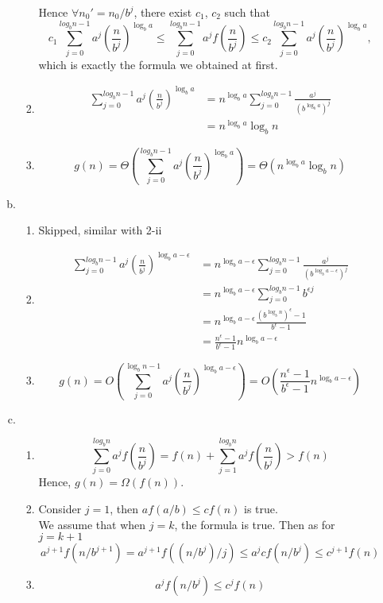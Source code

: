 \documentclass[a4paper]{article}
\begin{document}
\begin{enumerate}[1.]
\begin{enumerate}[a)]
\begin{enumerate}[i - ]
				Hence $\forall n_0' = n_0/b^j$, there exist $c_1$, $c_2$ such that
				$$c_1\sum_{j=0}^{log_bn-1}a^j(\frac{n}{b^j})^{\log_ba}\leq \sum_{j=0}^{log_bn-1}a^jf(\frac{n}{b^j}) \leq c_2\sum_{j=0}^{log_bn-1}a^j(\frac{n}{b^j})^{\log_ba},$$
				which is exactly the formula we obtained at first.
				\item
				\begin{align*}
					\sum_{j=0}^{log_bn-1}a^j(\frac{n}{b^j})^{\log_ba}&=n^{\log_ba}\sum_{j=0}^{log_bn-1}\frac{a^j}{(b^{\log_ba})^j}\\
					&=n^{\log_ba}\log_bn
				\end{align*}
				\item $$g(n) = \Theta\left(\sum_{j=0}^{log_bn-1}a^j(\frac{n}{b^j})^{\log_ba}\right)=\Theta(n^{\log_ba}\log_bn)$$
			\end{enumerate}
			\item
			\begin{enumerate}[i - ]
				\item Skipped, similar with 2-ii
				\item
				\begin{align*}
					\sum_{j=0}^{log_bn-1}a^j(\frac{n}{b^j})^{\log_ba-\epsilon}&=n^{\log_ba-\epsilon}\sum_{j=0}^{log_bn-1}\frac{a^j}{(b^{\log_ba-\epsilon})^j}\\
					&=n^{\log_ba-\epsilon}\sum_{j=0}^{log_bn-1}b^{\epsilon j}\\
					&=n^{\log_ba-\epsilon}\frac{(b^{\log_bn})^\epsilon-1}{b^\epsilon-1}\\
					&=\frac{n^\epsilon-1}{b^\epsilon-1}n^{\log_ba-\epsilon}
				\end{align*}
				\item $$g(n)=O\left(\sum_{j=0}^{\log_bn-1}a^j(\frac{n}{b^j})^{\log_ba-\epsilon}\right)=O\left(\frac{n^\epsilon-1}{b^\epsilon-1}n^{\log_ba-\epsilon}\right)$$
			\end{enumerate}
			\item
			\begin{enumerate}[i - ]
				\item $$\sum_{j=0}^{log_bn}a^jf(\frac{n}{b^j}) = f(n) + \sum_{j=1}^{log_bn}a^jf(\frac{n}{b^j}) > f(n)$$
				Hence, $g(n) = \Omega(f(n))$.
				\item Consider $j=1$, then $af(a/b)\leq cf(n)$ is true.\\
				We assume that when $j=k$, the formula is true. Then as for $j=k+1$
				$$a^{j+1}f(n/b^{j+1}) = a^{j+1}f((n/b^j)/j)\leq a^{j}cf(n/b^j)\leq c^{j+1}f(n)$$
				\item $$a^jf(n/b^j)\leq c^jf(n)$$

\end{enumerate}
\end{enumerate}
\end{enumerate}
\end{document}
